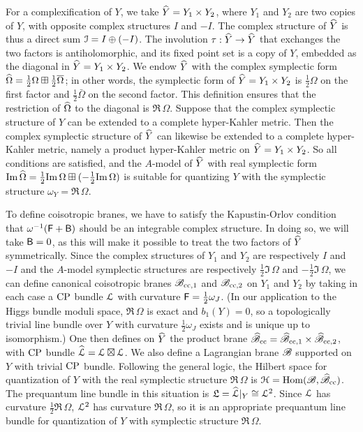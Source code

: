 \documentclass[11pt,a4paper]{article}
\begin{document}
For a complexification of $Y$, we take
$\widehat Y=Y_1\times Y_2$, where $Y_1$ and $Y_2$ are two copies of $Y$, with opposite complex structures $I$ and $-I$. The complex
structure of $\widehat Y$ is thus a direct sum ${\mathcal I}=I\oplus (-I)$.     The involution  $\tau:\widehat Y\to\widehat Y$
that exchanges the two factors is antiholomorphic, and its fixed point set is a copy of $Y$, embedded as the diagonal in $\widehat Y=Y_1\times Y_2$.
We endow $\widehat Y$ with the complex symplectic form $\widehat\Omega=\frac{1}{2}\Omega\boxplus \frac{1}{2}\overline\Omega$; in other words, the symplectic
form of $\widehat Y=Y_1\times Y_2$ is $\frac{1}{2}\Omega$ on the first factor and $\frac{1}{2}\bar\Omega$ on the second factor.  This definition ensures
that the restriction of $\widehat\Omega$ to the diagonal is $\Re\,\Omega$.   Suppose that the complex symplectic structure of $Y$ can be extended to a complete
hyper-Kahler metric.   Then the complex symplectic structure of $\widehat Y$ can likewise be extended to a complete hyper-Kahler metric,
 namely  a product hyper-Kahler metric on $\widehat Y=Y_1\times Y_2$.
So all conditions are satisfied, and  the $A$-model of $\widehat Y$ with real symplectic form 
${\mathrm{Im}}\,\widehat\Omega=\frac{1}{2}{\mathrm{Im}}\,\Omega\boxplus (-\frac{1}{2}{\mathrm{Im}}\,\Omega)$
is suitable for quantizing $Y$ with the symplectic structure $\omega_Y=\Re\,\Omega$.  

To define coisotropic branes, we have to satisfy
 the Kapustin-Orlov condition that $\omega^{-1} ({\sf F}+{\sf B})$ should be an integrable complex structure.  In doing so, we  will take ${\sf B}=0$, as this will make
it possible to treat the two factors of $\widehat Y$ symmetrically.
   Since the complex structures
of $Y_1$ and $Y_2$ are respectively $I$ and $-I$ and the $A$-model symplectic structures are respectively $\frac{1}{2}\Im\,\Omega$ and $-\frac{1}{2}\Im\,\Omega$,
we can define canonical coisotropic branes  ${\mathscr B}_{{\mathrm{cc}},1}$ and ${\mathscr B}_{{\mathrm{cc}},2}$ on $Y_1$ and $Y_2$ by taking in each case a ${\mathrm{CP}}$ bundle  ${\mathcal L}$ with curvature
 ${\sf F}=\frac{1}{2}\omega_J$.   (In our application to the Higgs bundle moduli space, $\Re\,\Omega$ is exact and $b_1(Y)=0$, so a topologically trivial line bundle over $Y$
 with curvature $\frac{1}{2}\omega_J$ exists and is unique up to isomorphism.)  
 One then defines on $\widehat Y$ the product brane $\widehat{{\mathscr B}}_{\mathrm{cc}}=\widehat{{\mathscr B}}_{{\mathrm{cc}},1}\times
 \widehat{{\mathscr B}}_{{\mathrm{cc}},2}$, with ${\mathrm{CP}}$ bundle $\widehat{{\mathcal L}}={\mathcal L}\boxtimes{\mathcal L}$.
         We also define a Lagrangian brane ${\mathscr B}$ supported on $Y$ with trivial ${\mathrm{CP}}$ bundle.   Following the general logic, the Hilbert space for quantization of $Y$ with the real symplectic structure $\Re\,\Omega$ is ${\mathcal H}={\mathrm{Hom}}({\mathscr B},\widehat{{\mathscr B}}_{\mathrm{cc}})$.   The prequantum line bundle in this situation is ${{\mathfrak L}}=\widehat{{\mathcal L}}|_Y\cong {\mathcal L}^2$.   Since ${\mathcal L}$ has curvature
         $\frac{1}{2}\Re\,\Omega$, ${\mathcal L}^2$ has curvature $\Re\,\Omega$, so it is an appropriate prequantum line bundle for quantization of $Y$ with symplectic
         structure $\Re\,\Omega$.   
\end{document}
